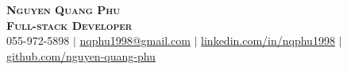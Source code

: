 \documentclass[letterpaper,11pt]{article}
\begin{document}

\begin{center}
	\textbf{\Huge \scshape Nguyen Quang Phu} \\ \vspace{4pt}
	\textbf{\Large \scshape Full-stack Developer} \\ \vspace{4pt}
	\small 055-972-5898 $|$ \href{mailto:nqphu1998@gmail.com}{\underline{nqphu1998@gmail.com}} $|$
	\href{https://linkedin.com/in/nqphu1998}{\underline{linkedin.com/in/nqphu1998}} $|$
	\href{https://github.com/nguyen-quang-phu}{\underline{github.com/nguyen-quang-phu}}
\end{center}

%


\end{document}
